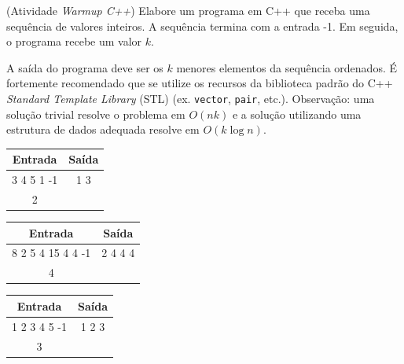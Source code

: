 \documentclass{article}
\begin{document}
(Atividade \emph{Warmup C++}) Elabore um programa em C++ que receba uma sequência de valores inteiros. A sequência termina com a entrada -1. Em seguida, o programa recebe um valor $k$.

A saída do programa deve ser os $k$ menores elementos da sequência ordenados. É fortemente recomendado que se utilize os recursos da biblioteca padrão do C++ \emph{Standard Template Library} (STL) (ex. \texttt{vector}, \texttt{pair}, etc.). Observação: uma solução trivial resolve o problema em $O(nk)$ e a solução utilizando uma estrutura de dados adequada resolve em $O(k \log n)$.

\vspace{1em}

\begin{table}[!htb]
    \centering
    \begin{minipage}[t]{0.32\textwidth}
        \centering
        \vspace{0pt}
        \begin{tabular}{cc}
            \hline
            Entrada     & Saída \\ \hline
            3 4 5 1 -1    & 1 3    \\ 
            2        &          \\
            \hline
        \end{tabular}
    \end{minipage}%
    \hfill
    \begin{minipage}[t]{0.32\textwidth}
        \centering
        \vspace{0pt}
        \begin{tabular}{cc}
            \hline
            Entrada     & Saída \\ \hline
            8 2 5 4 15 4 4 -1    & 2 4 4 4    \\ 
            4        &          \\
            \hline
        \end{tabular}
    \end{minipage}%
    \hfill
    \begin{minipage}[t]{0.32\textwidth}
        \centering
        \vspace{0pt}
        \begin{tabular}{cc}
            \hline
            Entrada    & Saída \\ \hline
            1 2 3 4 5 -1        &    1 2 3   \\
            3        &       \\ \hline
        \end{tabular}
    \end{minipage}
\end{table}
\end{document}
